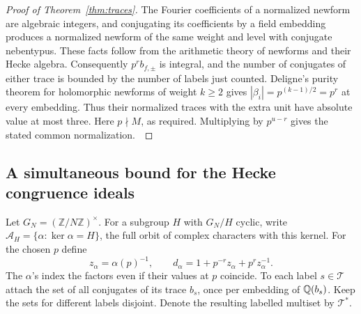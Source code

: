 \documentclass[a4paper,11pt]{article}
\theoremstyle{definition}
\theoremstyle{remark}
\newcommand{\ZZ}{\mathbb Z}\newcommand{\ord}{\operatorname{ord}}
\numberwithin{equation}{section}
\begin{document}
\begin{proof}[Proof of Theorem~\ref{thm:traces}]
The Fourier coefficients of a normalized newform are algebraic integers, and conjugating its coefficients by a field embedding produces a normalized newform of the same weight and level with conjugate nebentypus. These facts follow from the arithmetic theory of newforms and their Hecke algebra. Consequently \(p^r b_{f,\pm}\) is integral, and the number of conjugates of either trace is bounded by the number of labels just counted. Deligne's purity theorem for holomorphic newforms of weight \(k\ge2\) gives \(|\beta_i|=p^{(k-1)/2}=p^r\) at every embedding. Thus their normalized traces with the extra unit have absolute value at most three. Here \(p\nmid M\), as required. Multiplying by \(p^{u-r}\) gives the stated common normalization.~\cite{VI-IV-V-newforms,VI-IV-V-deligne,VI-IV-V-weil}
\end{proof}

\subsection{A simultaneous bound for the Hecke congruence ideals}\label{nav:III-01}
Let \(G_N=(\ZZ/N\ZZ)^\times\). For a subgroup \(H\) with \(G_N/H\) cyclic, write \(\mathcal A_H=\{\alpha:\ker\alpha=H\}\), the full orbit of complex characters with this kernel. For the chosen \(p\) define
\[
 z_\alpha=\alpha(p)^{-1},\qquad
 d_\alpha=1+p^{-r}z_\alpha+p^r z_\alpha^{-1}.
\]
The \(\alpha\)'s index the factors even if their values at \(p\) coincide. To each label \(s\in\mathcal T\) attach the set of all conjugates of its trace \(b_s\), once per embedding of \(\mathbb Q(b_s)\). Keep the sets for different labels disjoint. Denote the resulting labelled multiset by \(\mathcal T^*\).
\end{document}
